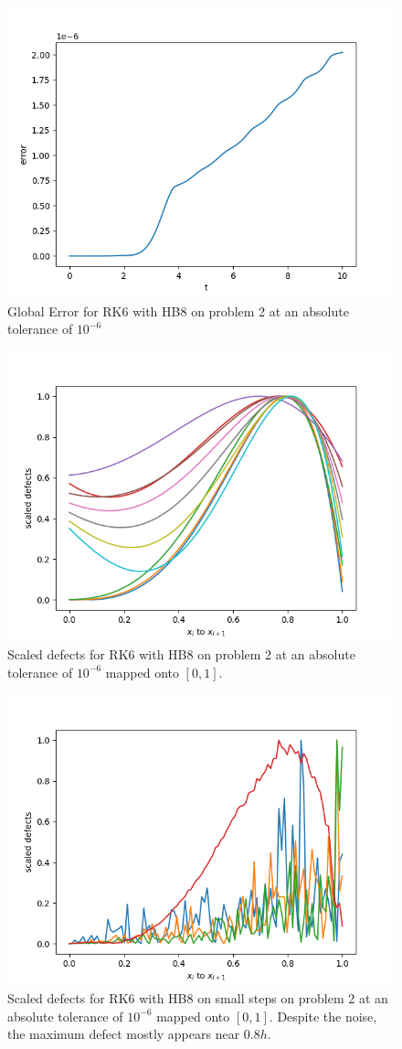 \begin{figure}[H]
\centering
\includegraphics[width=0.7\linewidth]{./figures/rk6_with_hb8_p2_global_error}
\caption{Global Error for RK6 with HB8 on problem 2 at an absolute tolerance of $10^{-6}$}
\label{fig:rk6_with_hb8_p2_global_error}
\end{figure}

\begin{figure}[H]
\centering
\includegraphics[width=0.7\linewidth]{./figures/rk6_with_hb8_p2_scaled_defects}
\caption{Scaled defects for RK6 with HB8 on problem 2 at an absolute tolerance of $10^{-6}$ mapped onto $[0, 1]$.}
\label{fig:rk6_with_hb8_p2_scaled_defects}
\end{figure}

\begin{figure}[H]
\centering
\includegraphics[width=0.7\linewidth]{./figures/rk6_with_hb8_p2_scaled_defects_small_steps}
\caption{Scaled defects for RK6 with HB8 on small steps on problem 2 at an absolute tolerance of $10^{-6}$ mapped onto $[0, 1]$. Despite the noise, the maximum defect mostly appears near $0.8h$.}
\label{fig:rk6_with_hb8_p2_scaled_defects_small_steps}
\end{figure}

